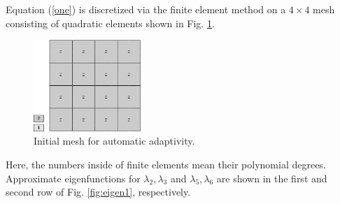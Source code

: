 \documentclass[preprint,12pt]{elsarticle}
\begin{document}
Equation (\ref{one}) is discretized via the finite element method
on a $4\times 4$ mesh consisting of quadratic elements shown in Fig. \ref{fig:mesh1}.\\

\begin{figure}[!ht]
\begin{center}
\includegraphics[width=0.36\textwidth]{img/mesh_1.png}
\end{center}
\vspace{-5mm}
\caption{Initial mesh for automatic adaptivity.}
\label{fig:mesh1}
\end{figure}

Here, the numbers inside of finite elements mean their polynomial degrees.
Approximate eigenfunctions for $\lambda_2, \lambda_3$ and $\lambda_5, \lambda_6$
are shown in the first and second row of Fig. \ref{fig:eigen1}, respectively.

\clearpage
\end{document}

